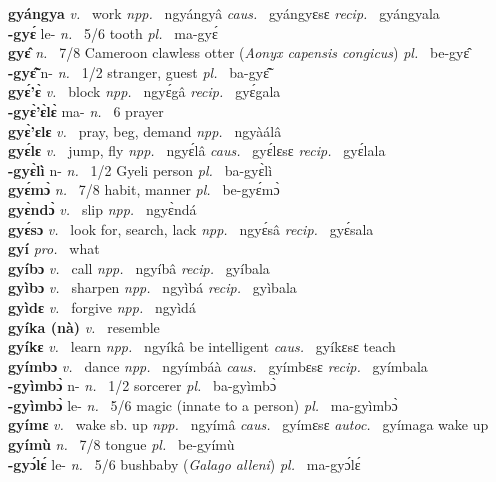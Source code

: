 {\bfseries gyángya}  {\itshape v.~} work   {\itshape npp.~} ngyángyâ {\itshape caus.~} gyángyɛsɛ {\itshape recip.~} gyángyala  \\ 
{\bfseries -gyɛ́} le- {\itshape n.~} 5/6 tooth {\itshape pl.~} ma-gyɛ́    \\ 
{\bfseries gyɛ̂}  {\itshape n.~} 7/8 Cameroon clawless otter ({\itshape Aonyx capensis congicus}) {\itshape pl.~} be-gyɛ̂    \\ 
{\bfseries -gyɛ̃̂} n- {\itshape n.~} 1/2 stranger, guest {\itshape pl.~} ba-gyɛ̃̂    \\ 
{\bfseries gyɛ́'ɛ̀}  {\itshape v.~} block   {\itshape npp.~} ngyɛ́gâ {\itshape recip.~} gyɛ́gala  \\ 
{\bfseries -gyɛ̀'ɛ̀lɛ̀} ma- {\itshape n.~} 6 prayer    \\ 
{\bfseries gyɛ̀'ɛlɛ}  {\itshape v.~} pray, beg, demand   {\itshape npp.~} ngyàálâ  \\ 
{\bfseries gyɛ́lɛ}  {\itshape v.~} jump, fly   {\itshape npp.~} ngyɛ́lâ {\itshape caus.~} gyɛ́lɛsɛ {\itshape recip.~} gyɛ́lala  \\ 
{\bfseries -gyɛ̀lì} n- {\itshape n.~} 1/2 Gyeli person {\itshape pl.~} ba-gyɛ̀lì    \\ 
{\bfseries gyɛ́mɔ̀}  {\itshape n.~} 7/8 habit, manner {\itshape pl.~} be-gyɛ́mɔ̀    \\ 
{\bfseries gyɛ̀ndɔ̀}  {\itshape v.~} slip   {\itshape npp.~} ngyɛ̀ndá  \\ 
{\bfseries gyɛ́sɔ}  {\itshape v.~} look for, search, lack   {\itshape npp.~} ngyɛ́sâ {\itshape recip.~} gyɛ́sala  \\ 
{\bfseries gyí}  {\itshape pro.~} what    \\ 
{\bfseries gyíbɔ}  {\itshape v.~} call   {\itshape npp.~} ngyíbâ {\itshape recip.~} gyíbala  \\ 
{\bfseries gyìbɔ}  {\itshape v.~} sharpen   {\itshape npp.~} ngyìbá {\itshape recip.~} gyìbala  \\ 
{\bfseries gyìdɛ}  {\itshape v.~} forgive   {\itshape npp.~} ngyìdá  \\ 
{\bfseries gyíka (nà)}  {\itshape v.~} resemble    \\ 
{\bfseries gyíkɛ}  {\itshape v.~} learn   {\itshape npp.~} ngyíkâ be intelligent {\itshape caus.~} gyíkɛsɛ teach  \\ 
{\bfseries gyímbɔ}  {\itshape v.~} dance   {\itshape npp.~} ngyímbáà {\itshape caus.~} gyímbɛsɛ {\itshape recip.~} gyímbala  \\ 
{\bfseries -gyìmbɔ̀} n- {\itshape n.~} 1/2 sorcerer {\itshape pl.~} ba-gyìmbɔ̀    \\ 
{\bfseries -gyìmbɔ̀} le- {\itshape n.~} 5/6 magic (innate to a person) {\itshape pl.~} ma-gyìmbɔ̀    \\ 
{\bfseries gyímɛ}  {\itshape v.~} wake sb. up   {\itshape npp.~} ngyímâ {\itshape caus.~} gyímɛsɛ {\itshape autoc.~} gyímaga wake up  \\ 
{\bfseries gyímù}  {\itshape n.~} 7/8 tongue {\itshape pl.~} be-gyímù    \\ 
{\bfseries -gyɔ́lɛ́} le- {\itshape n.~} 5/6 bushbaby ({\itshape Galago alleni}) {\itshape pl.~} ma-gyɔ́lɛ́    \\ 

